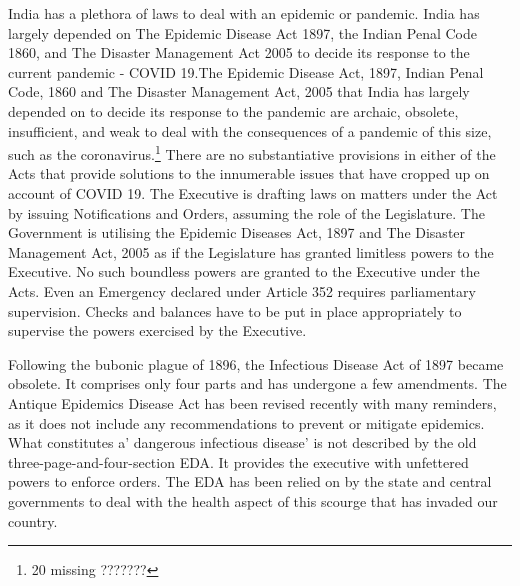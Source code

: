\begin{multicols}{2}

\noi
India has a plethora of laws to deal with an epidemic or pandemic. India has largely depended
on The Epidemic Disease Act 1897, the Indian Penal Code 1860, and The Disaster
Management Act 2005 to decide its response to the current pandemic - COVID 19.The
Epidemic Disease Act, 1897, Indian Penal Code, 1860 and The Disaster Management Act,
2005 that India has largely depended on to decide its response to the pandemic are archaic,
obsolete, insufficient, and weak to deal with the consequences of a pandemic of this size, 
such as the coronavirus.\footnote{20 missing ???????} There are no substantiative provisions in either of the Acts that
provide solutions to the innumerable issues that have cropped up on account of COVID 19.
The Executive is drafting laws on matters under the Act by issuing Notifications and Orders,
assuming the role of the Legislature. The Government is utilising the Epidemic Diseases Act,
1897 and The Disaster Management Act, 2005 as if the Legislature has granted limitless
powers to the Executive. No such boundless powers are granted to the Executive under the
Acts. Even an Emergency declared under Article 352 requires parliamentary supervision.
Checks and balances have to be put in place appropriately to supervise the powers exercised
by the Executive.


\noi
Following the bubonic plague of 1896, the Infectious Disease Act of 1897 became obsolete.
It comprises only four parts and has undergone a few amendments. The Antique Epidemics
Disease Act has been revised recently with many reminders, as it does not include any
recommendations to prevent or mitigate epidemics. What constitutes a' dangerous infectious
disease' is not described by the old three-page-and-four-section EDA. It provides the
executive with unfettered powers to enforce orders. The EDA has been relied on by the state
and central governments to deal with the health aspect of this scourge that has invaded our
country.


\end{multicols}
